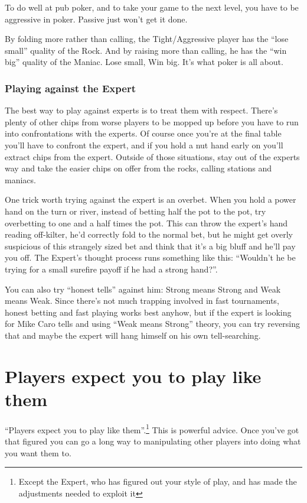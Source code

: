 To do well at pub poker, and to take your game to the next level,
you have to be aggressive in poker. Passive just won't get it done.

By folding more rather than calling, the Tight/Aggressive player
has the ``lose small'' quality of the Rock. And by raising more than
calling, he has the ``win big'' quality of the Maniac. Lose small, Win big.
It's what poker is all about.

\subsubsection{Playing against the Expert}

The best way to play against experts
is to treat them with respect. There's plenty of other chips
from worse players to be mopped up before you have to run into
confrontations with the experts. Of course once you're at the final
table you'll have to confront the expert, and if you hold a nut hand
early on you'll extract chips from the expert. Outside of those
situations, stay out of the experts way and take the easier chips
on offer from the rocks, calling stations and maniacs.

One trick worth trying against the expert is an overbet. When you
hold a power hand on the turn or river, instead of betting half the pot
to the pot, try overbetting to one and a half times the pot. This can
throw the expert's hand reading off-kilter, he'd correctly fold to
the normal bet, but he might get overly suspicious of this strangely
sized bet and think that it's a big bluff and he'll pay you off.
The Expert's thought process runs something like this: ``Wouldn't he
be trying for a small surefire payoff if he had a strong hand?''.

You can also try ``honest tells'' against him: Strong means Strong and
Weak means Weak. Since there's not much trapping involved in fast
tournaments, honest betting and fast playing works best anyhow, but
if the expert is looking for Mike Caro tells and using
``Weak means Strong'' theory, you can try reversing that and maybe
the expert will hang himself on his own tell-searching.

\section{Players expect you to play like them}

``Players expect you to play like them''.\footnote{Except the Expert, who
has figured out your style of play, and has made the adjustments
needed to exploit it} This is powerful advice.
Once you've got that figured you
can go a long way to manipulating other players into doing what
you want them to.

